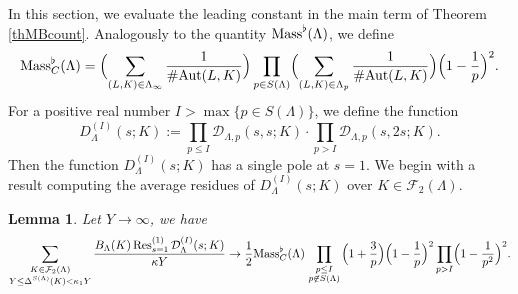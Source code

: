 \documentclass[10pt]{article}
\theoremstyle{plain}
\newtheorem{lemma}[thm]{Lemma}
\theoremstyle{definition}
\theoremstyle{remark}
\DeclareMathOperator{\Res}{Res}
\DeclareMathOperator{\Aut}{Aut}
\def\Aut{{\rm Aut}}
\def\Mass{{\rm Mass}}
\def\Disc{{\Delta}}
\def\FF{{\mathcal F}}
\def\cD{{\mathcal D}}
\begin{document}
In this section, we evaluate the leading constant in the main term of
Theorem \ref{thMBcount}. Analogously to the quantity
$\Mass^\flat(\Lambda)$, we define
\begin{equation*}
\Mass_C^\flat(\Lambda)=\Bigl(\sum_{(L,K)\in\Lambda_\infty}\frac{1}{\#\Aut(L,K)}\Bigr)
\prod_{p\in S(\Lambda)} \Bigl(\sum_{(L,K)\in\Lambda_p}
\frac{1}{\#\Aut(L,K)}\Bigr)\Bigl( 1-\frac{1}{p}\Bigr)^2.
\end{equation*}
For a positive real number $I>\max\{p\in S(\Lambda)\}$, we define the function
\begin{equation*}
  D_\Lambda^{(I)}(s;K):=
  \prod_{p\leq I}\cD_{\Lambda,p}(s,s;K)\cdot\prod_{p>I}\cD_{\Lambda,p}(s,2s;K).
\end{equation*}
Then the function $D^{(I)}_\Lambda(s;K)$ has a single pole at $s=1$.  We begin
with a result computing the average residues of $D^{(I)}_\Lambda(s;K)$ over
$K\in \FF_2(\Lambda)$.
\begin{lemma}\label{lemauxres}
Let $Y\to\infty$, we have
\begin{equation*}
  \sum_{\substack{K\in\FF_2(\Lambda)\\Y\leq \Disc^{S(\Lambda)}(K)<\kappa_1Y}}
  \frac{B_\Lambda(K)\Res^{(1)}_{s=1}\cD^{(I)}_\Lambda(s;K)}{\kappa Y}\to
\frac12\Mass^\flat_C(\Lambda)
\prod_{{\scriptstyle p\leq I \atop \scriptstyle p\not\in S(\Lambda)}}\Bigl(1+\frac{3}{p}\Bigr)\Bigl(1-\frac{1}{p}\Bigr)^2
\prod_{p>I}\Bigl(1-\frac{1}{p^2}\Bigr)^2.
\end{equation*}  
\end{lemma}
\end{document}
